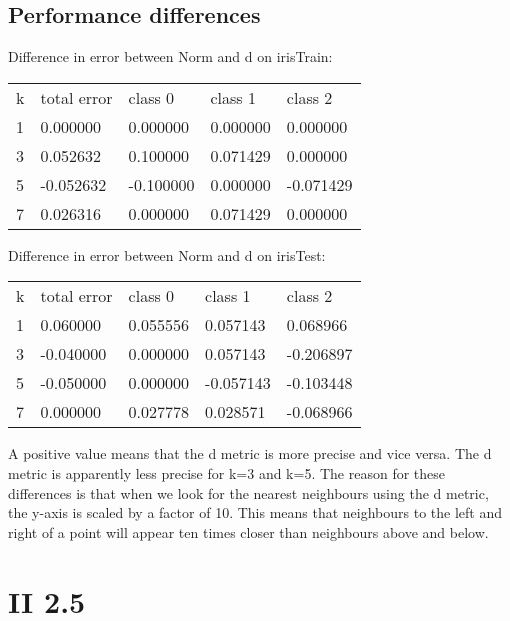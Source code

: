 \documentclass[a4paper,10pt]{article}
\begin{document}
\subsection*{Performance differences}
Difference in error between Norm and d on irisTrain:\\
\begin{center}
\begin{tabular}{l|llll}
 k & total error & class 0 & class 1 & class 2\\
 1 & 0.000000 & 0.000000 & 0.000000 & 0.000000 \\
 3 & 0.052632 & 0.100000 & 0.071429 & 0.000000 \\
 5 & -0.052632 & -0.100000 & 0.000000 & -0.071429 \\
 7 & 0.026316 & 0.000000 & 0.071429 & 0.000000 \\
\end{tabular}
\end{center}
Difference in error between Norm and d on irisTest:\\
\begin{center}
\begin{tabular}{l|llll}
 k & total error & class 0 & class 1 & class 2\\
 1 & 0.060000 & 0.055556 & 0.057143 & 0.068966 \\
 3 & -0.040000 & 0.000000 & 0.057143 & -0.206897 \\
 5 & -0.050000 & 0.000000 & -0.057143 & -0.103448 \\
 7 & 0.000000 & 0.027778 & 0.028571 & -0.068966 \\
\end{tabular}
\end{center}

A positive value means that the d metric is more precise and vice versa. The d metric
is apparently less precise for k=3 and k=5.
The reason for these differences is that when we look for the nearest
neighbours using the d metric, the y-axis is scaled by a factor of 10. This means that neighbours to the left and right of a point will appear ten times
closer than neighbours above and below.
\section{II 2.5}
\end{document}
